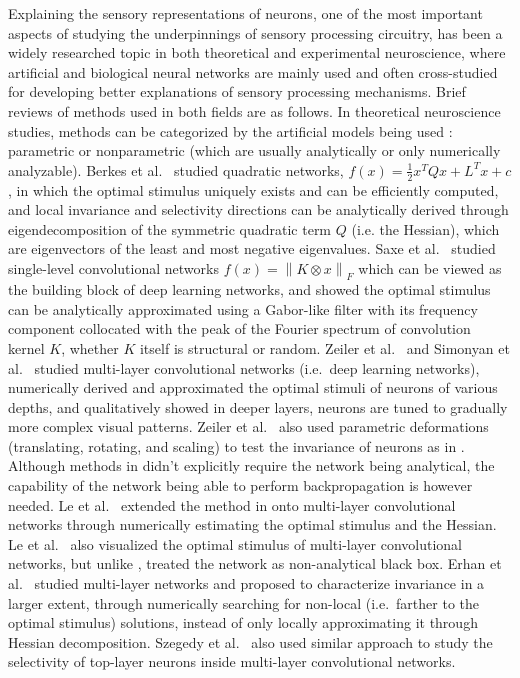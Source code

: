 Explaining the sensory representations of neurons, one of the most important aspects of studying the underpinnings of sensory processing circuitry, has been a widely researched topic in both theoretical and experimental neuroscience, where artificial and biological neural networks are mainly used and often cross-studied for developing better explanations of sensory processing mechanisms.  Brief reviews of methods used in both fields are as follows. In theoretical neuroscience studies, methods can be categorized by the artificial models being used \cite{wu2006complete}: parametric or nonparametric (which are usually analytically or only numerically analyzable). Berkes et al.~\cite{berkes2006analysis} studied quadratic networks, $f\left(x\right) = \frac{1}{2}x^{T}Qx+L^{T}x+c$, in which the optimal stimulus uniquely exists and can be efficiently computed, and local invariance and selectivity directions can be analytically derived through eigendecomposition of the symmetric quadratic term $Q$ (i.e. the Hessian), which are eigenvectors of the least and most negative eigenvalues. Saxe et al.~\cite{saxe2011random} studied single-level convolutional networks $f(x) = \left\| K \otimes x \right\|_{F}$ which can be viewed as the building block of deep learning networks, and showed the optimal stimulus can be analytically approximated using a Gabor-like filter with its frequency component collocated with the peak of the Fourier spectrum of convolution kernel $K$, whether $K$ itself is structural or random. Zeiler et al.~\cite{zeiler2014visualizing} and Simonyan et al.~\cite{simonyan2013deep} studied multi-layer convolutional networks (i.e.~deep learning networks), numerically derived and approximated the optimal stimuli of neurons of various depths, and qualitatively showed in deeper layers, neurons are tuned to gradually more complex visual patterns. Zeiler et al.~\cite{zeiler2014visualizing} also used parametric deformations (translating, rotating, and scaling) to test the invariance of neurons as in \cite{goodfellow2009measuring}. Although methods in \cite{zeiler2014visualizing, simonyan2013deep} didn't explicitly require the network being analytical, the capability of the network being able to perform backpropagation is however needed. Le et al.~\cite{ngiam2010tiled} extended the method in \cite{berkes2006analysis} onto multi-layer convolutional networks through numerically estimating the optimal stimulus and the Hessian. Le et al.~\cite{le2012building} also visualized the optimal stimulus of multi-layer convolutional networks, but unlike \cite{zeiler2014visualizing, simonyan2013deep}, treated the network as non-analytical black box. Erhan et al.~\cite{erhan2010understanding} studied multi-layer networks and proposed to characterize invariance in a larger extent, through numerically searching for non-local (i.e.~farther to the optimal stimulus) solutions, instead of only locally approximating it through Hessian decomposition. Szegedy et al.~\cite{szegedy2013intriguing} also used similar approach to study the selectivity of top-layer neurons inside multi-layer convolutional networks.

